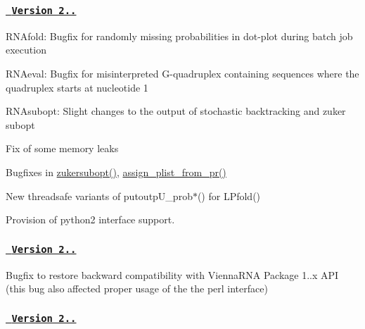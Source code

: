 \subsubsection*{\href{https://github.com/ViennaRNA/ViennaRNA/compare/v2.1.1...v2.1.2}{\texttt{ Version 2..}}}


\begin{DoxyItemize}
\item R\+N\+Afold\+: Bugfix for randomly missing probabilities in dot-\/plot during batch job execution
\item R\+N\+Aeval\+: Bugfix for misinterpreted G-\/quadruplex containing sequences where the quadruplex starts at nucleotide 1
\item R\+N\+Asubopt\+: Slight changes to the output of stochastic backtracking and zuker subopt
\item Fix of some memory leaks
\item Bugfixes in \mbox{\hyperlink{group__subopt__zuker_ga0d5104e3ecf119d8eabd40aa5fe47f90}{zukersubopt()}}, \mbox{\hyperlink{group__part__func__global__deprecated_ga1cc05aaa9b0e7df2d3887e98321c2030}{assign\+\_\+plist\+\_\+from\+\_\+pr()}}
\item New threadsafe variants of putoutp\+U\+\_\+prob$\ast$() for L\+Pfold()
\item Provision of python2 interface support.
\end{DoxyItemize}

\subsubsection*{\href{https://github.com/ViennaRNA/ViennaRNA/compare/v2.1.0...v2.1.1}{\texttt{ Version 2..}}}


\begin{DoxyItemize}
\item Bugfix to restore backward compatibility with Vienna\+R\+NA Package 1..\+x A\+PI (this bug also affected proper usage of the the perl interface)
\end{DoxyItemize}

\subsubsection*{\href{https://github.com/ViennaRNA/ViennaRNA/compare/v2.0.7...v2.1.0}{\texttt{ Version 2..}}}


